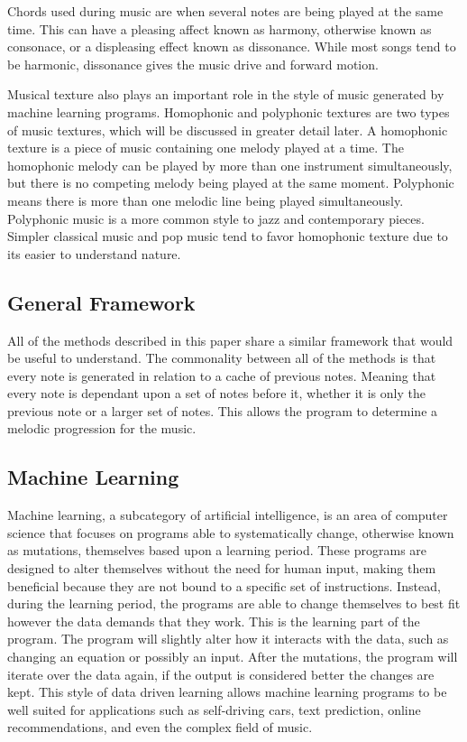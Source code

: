 \documentclass{sig-alternate}
\begin{document}
Chords used during music are when several notes are being played at the same time. This can have a pleasing affect known as harmony, otherwise known as consonace, or a displeasing effect known as dissonance. While most songs tend to be harmonic, dissonance gives the music drive and forward motion.

Musical texture also plays an important role in the style of music generated by machine learning programs. Homophonic and polyphonic textures are two types of music textures, which will be discussed in greater detail later. A homophonic texture is a piece of music containing one melody played at a time. The homophonic melody can be played by more than one instrument simultaneously, but there is no competing melody being played at the same moment. Polyphonic means there is more than one melodic line being played simultaneously. Polyphonic music is a more common style to jazz and contemporary pieces. Simpler classical music and pop music tend to favor homophonic texture due to its easier to understand nature.
\subsection{General Framework}
\label{sec:framework}
	All of the methods described in this paper share a similar framework that would be useful to understand. The commonality between all of the methods is that every note is generated in relation to a cache of previous notes. Meaning that every note is dependant upon a set of notes before it, whether it is only the previous note or a larger set of notes. This allows the program to determine a melodic progression for the music.

\subsection{Machine Learning}
\label{sec:machinelearning}
	Machine learning, a subcategory of artificial intelligence, is an area of computer science that focuses on programs able to systematically change, otherwise known as mutations, themselves based upon a learning period. These programs are designed to alter themselves without the need for human input, making them beneficial because they are not bound to a specific set of instructions. Instead, during the learning period, the programs are able to change themselves to best fit however the data demands that they work. This is the learning part of the program. The program will slightly alter how it interacts with the data, such as changing an equation or possibly an input. After the mutations, the program will iterate over the data again, if the output is considered better the changes are kept.  This style of data driven learning allows machine learning programs to be well suited for applications such as self-driving cars, text prediction, online recommendations, and even the complex field of music.
\end{document}
